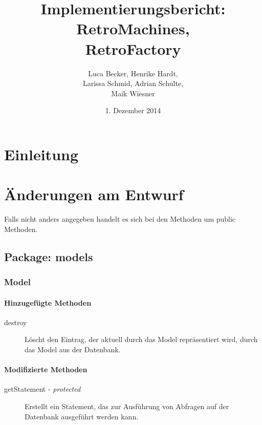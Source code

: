 \documentclass[parskip=full]{scrreprt}
\begin{document}
\title{Implementierungsbericht: RetroMachines, \\ RetroFactory}
\author{Luca Becker, Henrike Hardt,\\Larissa Schmid, Adrian Schulte,\\Maik Wiesner}
\date{1. Dezember 2014}
\maketitle
\thispagestyle{empty}

\clearpage

\thispagestyle{empty}
\tableofcontents
\thispagestyle{empty}

\clearpage
\setcounter{page}{1}

\chapter{Einleitung}

\chapter{Änderungen am Entwurf}

Falls nicht anders angegeben handelt es sich bei den Methoden um public Methoden.

\section{Package: models}

\subsection{Model}

\subsubsection{Hinzugefügte Methoden}
\begin{description}
	\item[destroy] Löscht den Eintrag, der aktuell durch das Model repräsentiert wird, durch das Model aus der Datenbank.
\end{description}

\subsubsection{Modifizierte Methoden}
\begin{description}
	\item[getStatement - \textit{protected}] Erstellt ein Statement, das zur Ausführung von Abfragen auf der Datenbank ausgeführt werden kann.
\end{description}
\end{document}
